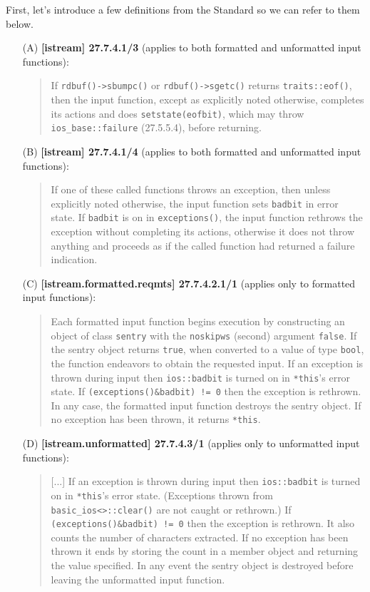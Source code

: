 \documentclass{wg21}
\newcommand{\cc}[1]{\texttt{#1}}
\begin{document}
First, let's introduce a few definitions from the Standard so we can refer to
them below.

\begin{enumerate}
  \item[(A)] \textbf{[istream] 27.7.4.1/3} (applies to both formatted and unformatted input functions):
  \begin{quote}
  If \cc{rdbuf()->sbumpc()} or \cc{rdbuf()->sgetc()} returns \cc{traits::eof()},
  then the input function, except as explicitly noted otherwise, completes its
  actions and does \cc{setstate(eofbit)}, which may throw \cc{ios_base::failure}
  (27.5.5.4), before returning.
  \end{quote}

  \item[(B)] \textbf{[istream] 27.7.4.1/4} (applies to both formatted and unformatted input functions):
  \begin{quote}
  If one of these called functions throws an exception, then unless explicitly
  noted otherwise, the input function sets \cc{badbit} in error state. If
  \cc{badbit} is on in \cc{exceptions()}, the input function rethrows the
  exception without completing its actions, otherwise it does not throw
  anything and proceeds as if the called function had returned a failure
  indication.
  \end{quote}

  \item[(C)] \textbf{[istream.formatted.reqmts] 27.7.4.2.1/1} (applies only to formatted input functions):
  \begin{quote}
  Each formatted input function begins execution by constructing an object of
  class \cc{sentry} with the \cc{noskipws} (second) argument \cc{false}. If
  the sentry object returns \cc{true}, when converted to a value of type
  \cc{bool}, the function endeavors to obtain the requested input. If an exception
  is thrown during input then \cc{ios::badbit} is turned on in \cc{*this}'s error
  state. If \cc{(exceptions()&badbit) != 0} then the exception is rethrown. In
  any case, the formatted input function destroys the sentry object. If no
  exception has been thrown, it returns \cc{*this}.
  \end{quote}

  \item[(D)] \textbf{[istream.unformatted] 27.7.4.3/1} (applies only to unformatted input functions):
  \begin{quote}
  [...] If an exception is thrown during input then \cc{ios::badbit} is turned
  on in \cc{*this}'s error state. (Exceptions thrown from \cc{basic_ios<>::clear()}
  are not caught or rethrown.) If \cc{(exceptions()&badbit) != 0} then the
  exception is rethrown. It also counts the number of characters extracted.
  If no exception has been thrown it ends by storing the count in a member
  object and returning the value specified. In any event the sentry object
  is destroyed before leaving the unformatted input function.
  \end{quote}
\end{enumerate}
\end{document}

